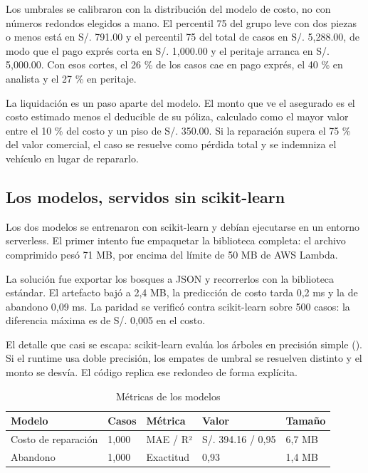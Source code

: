 \documentclass[12pt,letterpaper]{article}
\newcommand{\code}[1]{\texttt{\detokenize{#1}}}
\begin{document}
Los umbrales se calibraron con la distribución del modelo de costo, no con números
redondos elegidos a mano. El percentil 75 del grupo leve con dos piezas o menos está en
S/. 791.00 y el percentil 75 del total de casos en S/. 5,288.00, de modo que el pago
exprés corta en S/. 1,000.00 y el peritaje arranca en S/. 5,000.00. Con esos cortes, el
26 \% de los casos cae en pago exprés, el 40 \% en analista y el 27 \% en peritaje.

La liquidación es un paso aparte del modelo. El monto que ve el asegurado es el costo
estimado menos el deducible de su póliza, calculado como el mayor valor entre el 10 \% del
costo y un piso de S/. 350.00. Si la reparación supera el 75 \% del valor comercial, el
caso se resuelve como pérdida total y se indemniza el vehículo en lugar de repararlo.

\subsection{Los modelos, servidos sin scikit-learn}

Los dos modelos se entrenaron con scikit-learn y debían ejecutarse en un entorno
serverless. El primer intento fue empaquetar la biblioteca completa: el archivo comprimido
pesó 71 MB, por encima del límite de 50 MB de AWS Lambda.

La solución fue exportar los bosques a JSON y recorrerlos con la biblioteca estándar. El
artefacto bajó a 2,4 MB, la predicción de costo tarda 0,2 ms y la de abandono 0,09 ms. La
paridad se verificó contra scikit-learn sobre 500 casos: la diferencia máxima es de
S/. 0,005 en el costo.

El detalle que casi se escapa: scikit-learn evalúa los árboles en precisión simple
(\code{float32}). Si el runtime usa doble precisión, los empates de umbral se resuelven
distinto y el monto se desvía. El código replica ese redondeo de forma explícita.

\begin{table}[H]
\centering
\caption{Métricas de los modelos}
\label{tab:metricas}
\small
\begin{tabular}{p{3.6cm}p{2.2cm}p{2.4cm}p{2.4cm}p{2.6cm}}
\toprule
\textbf{Modelo} & \textbf{Casos} & \textbf{Métrica} & \textbf{Valor} & \textbf{Tamaño} \\
\midrule
Costo de reparación & 1,000 & MAE / R² & S/. 394.16 / 0,95 & 6,7 MB \\
Abandono & 1,000 & Exactitud & 0,93 & 1,4 MB \\
\bottomrule
\end{tabular}
\end{table}
\end{document}
